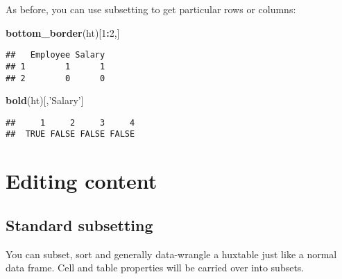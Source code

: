 \documentclass[]{article}
\newenvironment{Shaded}{\begin{snugshade}}{\end{snugshade}}
\newcommand{\KeywordTok}[1]{\textcolor[rgb]{0.13,0.29,0.53}{\textbf{#1}}}
\newcommand{\DataTypeTok}[1]{\textcolor[rgb]{0.13,0.29,0.53}{#1}}
\newcommand{\DecValTok}[1]{\textcolor[rgb]{0.00,0.00,0.81}{#1}}
\newcommand{\StringTok}[1]{\textcolor[rgb]{0.31,0.60,0.02}{#1}}
\newcommand{\CommentTok}[1]{\textcolor[rgb]{0.56,0.35,0.01}{\textit{#1}}}
\newcommand{\OperatorTok}[1]{\textcolor[rgb]{0.81,0.36,0.00}{\textbf{#1}}}
\newcommand{\NormalTok}[1]{#1}
\begin{document}
\FloatBarrier

As before, you can use subsetting to get particular rows or columns:

\begin{Shaded}
\begin{Highlighting}[]
\KeywordTok{bottom_border}\NormalTok{(ht)[}\DecValTok{1}\OperatorTok{:}\DecValTok{2}\NormalTok{,]}
\end{Highlighting}
\end{Shaded}

\begin{verbatim}
##   Employee Salary
## 1        1      1
## 2        0      0
\end{verbatim}

\begin{Shaded}
\begin{Highlighting}[]
\KeywordTok{bold}\NormalTok{(ht)[,}\StringTok{'Salary'}\NormalTok{]}
\end{Highlighting}
\end{Shaded}

\begin{verbatim}
##     1     2     3     4 
##  TRUE FALSE FALSE FALSE
\end{verbatim}

\FloatBarrier

\section{Editing content}\label{editing-content}

\subsection{Standard subsetting}\label{standard-subsetting}

You can subset, sort and generally data-wrangle a huxtable just like a
normal data frame. Cell and table properties will be carried over into
subsets.

\begin{Shaded}
\end{Shaded}
\end{document}
